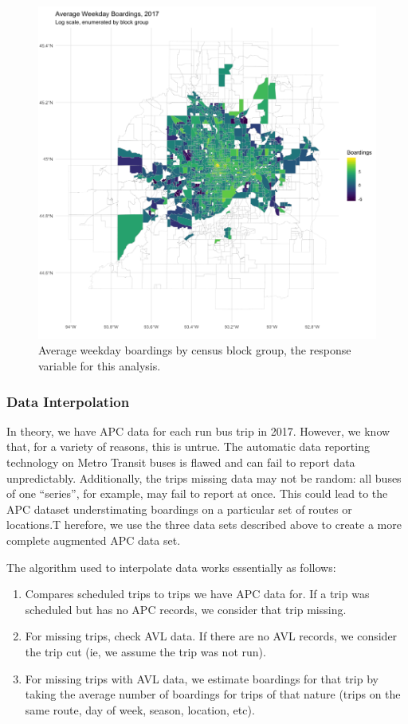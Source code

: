 \documentclass[
]{article}
\providecommand{\tightlist}{%
  \setlength{\itemsep}{0pt}\setlength{\parskip}{0pt}}
\begin{document}
\begin{figure}[H]
  \centering
  \includegraphics[width = 5in]{weekdayboardings.png}
  \caption{Average weekday boardings by census block group, the response variable for this analysis.}
\end{figure}

\hypertarget{data-interpolation}{%
\subsubsection{Data Interpolation}\label{data-interpolation}}

In theory, we have APC data for each run bus trip in 2017. However, we
know that, for a variety of reasons, this is untrue. The automatic data
reporting technology on Metro Transit buses is flawed and can fail to
report data unpredictably. Additionally, the trips missing data may not
be random: all buses of one ``series'', for example, may fail to report
at once. This could lead to the APC dataset understimating boardings on
a particular set of routes or locations.T herefore, we use the three
data sets described above to create a more complete augmented APC data
set.

The algorithm used to interpolate data works essentially as follows:

\begin{enumerate}
\def\labelenumi{\arabic{enumi}.}
\tightlist
\item
  Compares scheduled trips to trips we have APC data for. If a trip was
  scheduled but has no APC records, we consider that trip missing.
\item
  For missing trips, check AVL data. If there are no AVL records, we
  consider the trip cut (ie, we assume the trip was not run).
\item
  For missing trips with AVL data, we estimate boardings for that trip
  by taking the average number of boardings for trips of that nature
  (trips on the same route, day of week, season, location, etc).
\end{enumerate}
\end{document}
